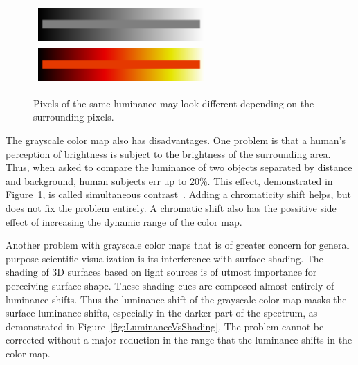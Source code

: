 \documentclass{acmsiggraph}               %
\newcommand{\lcite}[1]{~\cite{#1}}
\begin{document}
\begin{figure}
  \centering
  \begin{tabular}{c}
    \includegraphics[width=2.5in]{images/GrayscaleLocality} \\
    \includegraphics[width=2.5in]{images/BlackBodyLocality}
  \end{tabular}
  \caption{Pixels of the same luminance may look different depending on the
    surrounding pixels.}
  \label{fig:SimultaneousContrast}
\end{figure}
The grayscale color map also has disadvantages.  One problem is
that a human's perception of brightness is subject to the brightness of the
surrounding area.  Thus, when asked to compare the luminance of two objects
separated by distance and background, human subjects err up to 20\%.
This effect, demonstrated in Figure~\ref{fig:SimultaneousContrast}, is
called simultaneous contrast\lcite{Stone05}.  Adding a chromaticity shift
helps, but does not fix the problem entirely.  A chromatic shift also has
the possitive side effect of increasing the dynamic range of the color
map.


Another problem with grayscale color maps that is of greater concern for
general purpose scientific visualization is its interference with surface
shading.  The shading of 3D surfaces based on light sources is of utmost
importance for perceiving surface shape.  These shading cues are
composed almost entirely of luminance shifts.  Thus the luminance shift of
the grayscale color map masks the surface luminance shifts, especially in
the darker part of the spectrum, as demonstrated in
Figure~\ref{fig:LuminanceVsShading}.  The problem cannot be corrected
without a major reduction in the range that the luminance shifts in the color
map.
\end{document}
